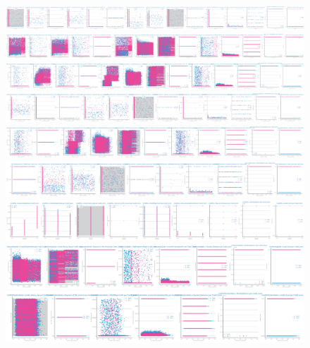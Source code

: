 \documentclass[10pt]{extarticle}
\begin{document}
\begin{figure}[H]
\includegraphics[scale=0.10]{images/dataset2/data_profiling/Credit_Score_sparsity_NumofLoan_per_class.png}
\includegraphics[scale=0.10]{images/dataset2/data_profiling/Credit_Score_sparsity_Type_of_Loan_per_class.png}
\includegraphics[scale=0.10]{images/dataset2/data_profiling/Credit_Score_sparsity_Delay_from_due_date_per_class.png}
\includegraphics[scale=0.10]{images/dataset2/data_profiling/Credit_Score_sparsity_NumofDelayedPayment_per_class.png}
\includegraphics[scale=0.10]{images/dataset2/data_profiling/Credit_Score_sparsity_ChangedCreditLimit_per_class.png}
\includegraphics[scale=0.10]{images/dataset2/data_profiling/Credit_Score_sparsity_NumCreditInquiries_per_class.png}
\includegraphics[scale=0.10]{images/dataset2/data_profiling/Credit_Score_sparsity_CreditMix_per_class.png}
\includegraphics[scale=0.10]{images/dataset2/data_profiling/Credit_Score_sparsity_OutstandingDebt_per_class.png}
\includegraphics[scale=0.10]{images/dataset2/data_profiling/Credit_Score_sparsity_CreditUtilizationRatio_per_class.png}

\end{figure}
\end{document}
